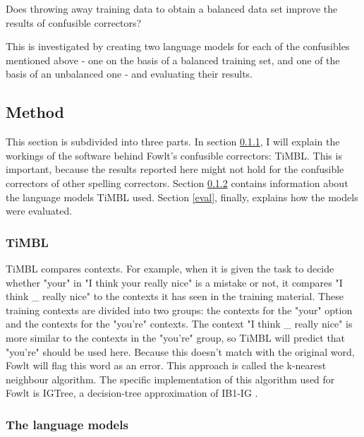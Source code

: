 \documentclass[12pt]{article}
\begin{document}
\begin{examples}

\item Does throwing away training data to obtain a balanced data set improve the results of confusible correctors?

\end{examples}

This is investigated by creating two language models for each of the confusibles mentioned above - one on the basis of a balanced training set, and one of the basis of an unbalanced one - and evaluating their results.


\subsection{Method}
This section is subdivided into three parts. In section \ref{timbl}, I will explain the workings of the software behind Fowlt's confusible correctors: TiMBL. This is important, because the results reported here might not hold for the confusible correctors of other spelling correctors. Section \ref{langmod} contains information about the language models  TiMBL used. Section \ref{eval}, finally, explains how the models were evaluated.


\subsubsection{TiMBL} \label{timbl}
TiMBL compares contexts. For example, when it is given the task to decide whether "your" in "I think your really nice" is a mistake or not, it compares "I think \_ really nice" to the contexts it has seen in the training material. These training contexts are divided into two groups: the contexts for the "your" option and the contexts for the "you're" contexts. The context "I think \_ really nice" is more similar to the contexts in the "you're" group, so TiMBL will predict that "you're" should be used here. Because this doesn't match with the original word, Fowlt will flag this word as an error. This approach is called the k-nearest neighbour algorithm. The specific implementation of this algorithm used for Fowlt is IGTree, a decision-tree approximation of IB1-IG \citep*{dvdbw97}.

\subsubsection{The language models} \label{langmod}
\end{document}

